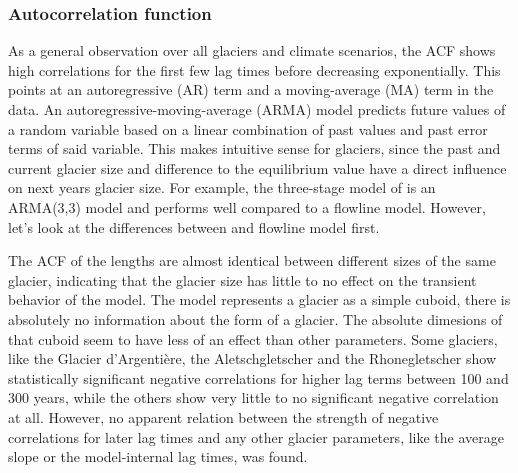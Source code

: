     \subsubsection{Autocorrelation function} %
    \label{ssub:autocorrelation_function_results}

      As a general observation over all glaciers and climate scenarios, the ACF shows high correlations for the first few lag times before decreasing exponentially. This points at an autoregressive (AR) term and a moving-average (MA) term in the data. An autoregressive-moving-average (ARMA) model predicts future values of a random variable based on a linear combination of past values and past error terms of said variable. This makes intuitive sense for glaciers, since the past and current glacier size and difference to the equilibrium value have a direct influence on next years glacier size. For example, the three-stage model of \citet{Roe2014} is an ARMA(3,3) model and performs well compared to a flowline model. However, let's look at the differences between \vas{} and flowline model first.

      The ACF of the \vas{} lengths are almost identical between different sizes of the same glacier, indicating that the glacier size has little to no effect on the transient behavior of the model. The \vas{} model represents a glacier as a simple cuboid, there is absolutely no information about the form of a glacier. The absolute dimesions of that cuboid seem to have less of an effect than other parameters. Some glaciers, like the Glacier d'Argentière, the Aletschgletscher and the Rhonegletscher show statistically significant negative correlations for higher lag terms between 100 and 300 years, while the others show very little to no significant negative correlation at all. However, no apparent relation between the strength of negative correlations for later lag times and any other glacier parameters, like the average slope or the model-internal lag times, was found. %

    
